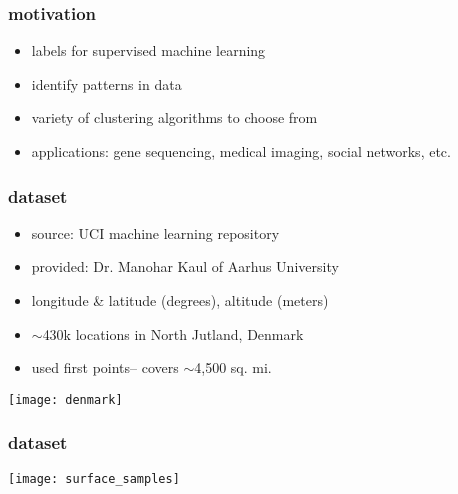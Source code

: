 \begin{frame}
\frametitle{motivation}
	
	\begin{itemize}
		\item labels for supervised machine learning
		\item identify patterns in data
		\item variety of clustering algorithms to choose from
		\item applications: gene sequencing, medical imaging, social networks, etc.
	\end{itemize}

\end{frame}

\begin{frame}
\frametitle{dataset}
	
	\begin{itemize}
		\setlength{\itemindent}{4em}
		\item source: UCI machine learning repository
		\item provided: Dr. Manohar Kaul of Aarhus University
		\item longitude \& latitude (degrees), altitude (meters)
		\item $\sim$430k locations in North Jutland, Denmark \cite{dataset}
		\item used first \N points-- covers $\sim$4,500 sq. mi.
	\end{itemize}
	
	{
	     \centering
	     \texttt{[image: denmark]}
		\vfill
	}

\end{frame}

\begin{frame} %
\frametitle{dataset}

	{
	     \centering
	     \texttt{[image: surface\_samples]}
		\vfill
	}

\end{frame}